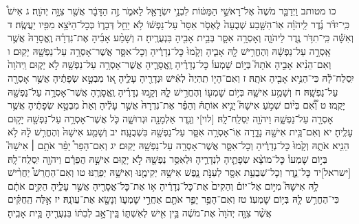 \documentclass[twoside, openany, parskip=half, 11pt]{book}
\begin{document}
כו מטותב וַיְדַבֵּ֤ר מֹשֶׁה֙ אֶל־רָאשֵׁ֣י הַמַּטּ֔וֹת לִבְנֵ֥י יִשְׂרָאֵ֖ל לֵאמֹ֑ר זֶ֣ה הַדָּבָ֔ר אֲשֶׁ֖ר צִוָּ֥ה יְהֹוָֽה׃ ג אִישׁ֩ כִּֽי־יִדֹּ֨ר נֶ֜דֶר לַֽיהֹוָ֗ה אֽוֹ־הִשָּׁ֤בַע שְׁבֻעָה֙ לֶאְסֹ֤ר אִסָּר֙ עַל־נַפְשׁ֔וֹ לֹ֥א יַחֵ֖ל דְּבָר֑וֹ כְּכׇל־הַיֹּצֵ֥א מִפִּ֖יו יַעֲשֶֽׂה׃ ד וְאִשָּׁ֕ה כִּֽי־תִדֹּ֥ר נֶ֖דֶר לַיהֹוָ֑ה וְאָסְרָ֥ה אִסָּ֛ר בְּבֵ֥ית אָבִ֖יהָ בִּנְעֻרֶֽיהָ׃ ה וְשָׁמַ֨ע אָבִ֜יהָ אֶת־נִדְרָ֗הּ וֶֽאֱסָרָהּ֙ אֲשֶׁ֣ר אָֽסְרָ֣ה עַל־נַפְשָׁ֔הּ וְהֶחֱרִ֥ישׁ לָ֖הּ אָבִ֑יהָ וְקָ֙מוּ֙ כׇּל־נְדָרֶ֔יהָ וְכׇל־אִסָּ֛ר אֲשֶׁר־אָסְרָ֥ה עַל־נַפְשָׁ֖הּ יָקֽוּם׃ ו וְאִם־הֵנִ֨יא אָבִ֣יהָ אֹתָהּ֮ בְּי֣וֹם שׇׁמְעוֹ֒ כׇּל־נְדָרֶ֗יהָ וֶֽאֱסָרֶ֛יהָ אֲשֶׁר־אָסְרָ֥ה עַל־נַפְשָׁ֖הּ לֹ֣א יָק֑וּם וַֽיהֹוָה֙ יִֽסְלַח־לָ֔הּ כִּי־הֵנִ֥יא אָבִ֖יהָ אֹתָֽהּ׃ ז וְאִם־הָי֤וֹ תִֽהְיֶה֙ לְאִ֔ישׁ וּנְדָרֶ֖יהָ עָלֶ֑יהָ א֚וֹ מִבְטָ֣א שְׂפָתֶ֔יהָ אֲשֶׁ֥ר אָסְרָ֖ה עַל־נַפְשָֽׁהּ׃ ח וְשָׁמַ֥ע אִישָׁ֛הּ בְּי֥וֹם שׇׁמְע֖וֹ וְהֶחֱרִ֣ישׁ לָ֑הּ וְקָ֣מוּ נְדָרֶ֗יהָ וֶֽאֱסָרֶ֛הָ אֲשֶׁר־אָסְרָ֥ה עַל־נַפְשָׁ֖הּ יָקֻֽמוּ׃ ט וְ֠אִ֠ם בְּי֨וֹם שְׁמֹ֣עַ אִישָׁהּ֮ יָנִ֣יא אוֹתָהּ֒ וְהֵפֵ֗ר אֶת־נִדְרָהּ֙ אֲשֶׁ֣ר עָלֶ֔יהָ וְאֵת֙ מִבְטָ֣א שְׂפָתֶ֔יהָ אֲשֶׁ֥ר אָסְרָ֖ה עַל־נַפְשָׁ֑הּ וַיהֹוָ֖ה יִֽסְלַֽח־לָֽהּ׃ [לוי]י וְנֵ֥דֶר אַלְמָנָ֖ה וּגְרוּשָׁ֑ה כֹּ֛ל אֲשֶׁר־אָסְרָ֥ה עַל־נַפְשָׁ֖הּ יָק֥וּם עָלֶֽיהָ׃ יא וְאִם־בֵּ֥ית אִישָׁ֖הּ נָדָ֑רָה אֽוֹ־אָסְרָ֥ה אִסָּ֛ר עַל־נַפְשָׁ֖הּ בִּשְׁבֻעָֽה׃ יב וְשָׁמַ֤ע אִישָׁהּ֙ וְהֶחֱרִ֣שׁ לָ֔הּ לֹ֥א הֵנִ֖יא אֹתָ֑הּ וְקָ֙מוּ֙ כׇּל־נְדָרֶ֔יהָ וְכׇל־אִסָּ֛ר אֲשֶׁר־אָסְרָ֥ה עַל־נַפְשָׁ֖הּ יָקֽוּם׃ יג וְאִם־הָפֵר֩ יָפֵ֨ר אֹתָ֥ם ׀ אִישָׁהּ֮ בְּי֣וֹם שׇׁמְעוֹ֒ כׇּל־מוֹצָ֨א שְׂפָתֶ֧יהָ לִנְדָרֶ֛יהָ וּלְאִסַּ֥ר נַפְשָׁ֖הּ לֹ֣א יָק֑וּם אִישָׁ֣הּ הֲפֵרָ֔ם וַיהֹוָ֖ה יִֽסְלַֽח־לָֽהּ׃ [ישראל]יד כׇּל־נֵ֛דֶר וְכׇל־שְׁבֻעַ֥ת אִסָּ֖ר לְעַנֹּ֣ת נָ֑פֶשׁ אִישָׁ֥הּ יְקִימֶ֖נּוּ וְאִישָׁ֥הּ יְפֵרֶֽנּוּ׃ טו וְאִם־הַחֲרֵשׁ֩ יַחֲרִ֨ישׁ לָ֥הּ אִישָׁהּ֮ מִיּ֣וֹם אֶל־יוֹם֒ וְהֵקִים֙ אֶת־כׇּל־נְדָרֶ֔יהָ א֥וֹ אֶת־כׇּל־אֱסָרֶ֖יהָ אֲשֶׁ֣ר עָלֶ֑יהָ הֵקִ֣ים אֹתָ֔ם כִּי־הֶחֱרִ֥שׁ לָ֖הּ בְּי֥וֹם שׇׁמְעֽוֹ׃ טז וְאִם־הָפֵ֥ר יָפֵ֛ר אֹתָ֖ם אַחֲרֵ֣י שׇׁמְע֑וֹ וְנָשָׂ֖א אֶת־עֲוֺנָֽהּ׃ יז אֵ֣לֶּה הַֽחֻקִּ֗ים אֲשֶׁ֨ר צִוָּ֤ה יְהֹוָה֙ אֶת־מֹשֶׁ֔ה בֵּ֥ין אִ֖ישׁ לְאִשְׁתּ֑וֹ בֵּֽין־אָ֣ב לְבִתּ֔וֹ בִּנְעֻרֶ֖יהָ בֵּ֥ית אָבִֽיהָ׃
\end{document}
